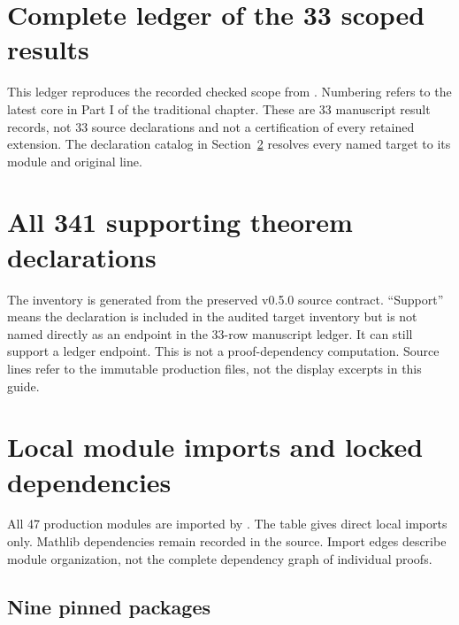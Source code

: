 \section{Complete ledger of the 33 scoped results}
\label{sec:ledger}
This ledger reproduces the recorded checked scope from . Numbering refers to the latest core in Part I of the traditional chapter. These are 33 manuscript result records, not 33 source declarations and not a certification of every retained extension. The declaration catalog in Section~\ref{sec:catalog} resolves every named target to its module and original line.

\clearpage
\section{All 341 supporting theorem declarations}
\label{sec:catalog}
The inventory is generated from the preserved v0.5.0 source contract. ``Support'' means the declaration is included in the audited target inventory but is not named directly as an endpoint in the 33-row manuscript ledger. It can still support a ledger endpoint. This is not a proof-dependency computation. Source lines refer to the immutable production files, not the display excerpts in this guide.

\clearpage
\section{Local module imports and locked dependencies}
\label{sec:imports}
All 47 production modules are imported by . The table gives direct local imports only. Mathlib dependencies remain recorded in the source. Import edges describe module organization, not the complete dependency graph of individual proofs.

\subsection{Nine pinned packages}


